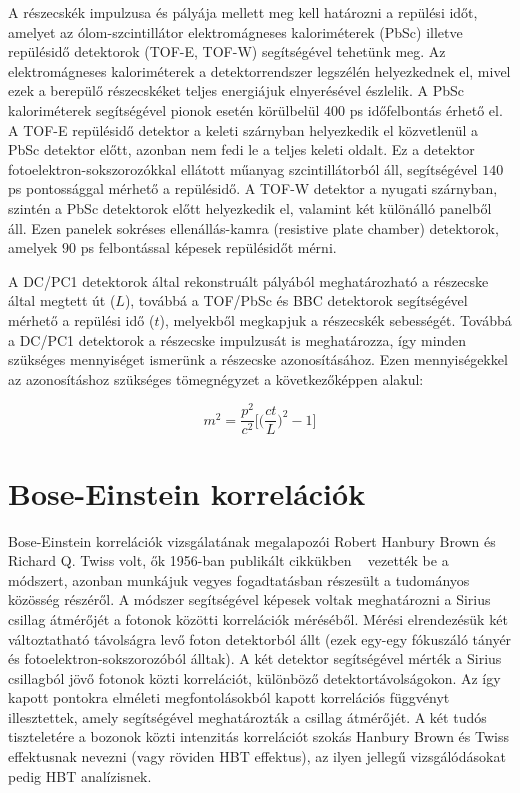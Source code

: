 \documentclass[11pt,a4paper]{article}
\numberwithin{equation}{subsection}
\numberwithin{figure}{section}
\begin{document}
A részecskék impulzusa és pályája mellett meg kell határozni a repülési időt, amelyet az  ólom-szcintillátor elektromágneses kaloriméterek (PbSc) illetve repülésidő detektorok (TOF-E, TOF-W) segítségével tehetünk meg. Az elektromágneses kaloriméterek a detektorrendszer legszélén helyezkednek el, mivel ezek a berepülő részecskéket teljes energiájuk elnyerésével észlelik. A PbSc kaloriméterek segítségével pionok esetén körülbelül $400$ ps időfelbontás érhető el. A TOF-E repülésidő detektor a keleti szárnyban helyezkedik el közvetlenül a PbSc detektor előtt, azonban nem fedi le a teljes keleti oldalt. Ez a detektor fotoelektron-sokszorozókkal ellátott műanyag szcintillátorból áll, segítségével $140$ ps pontossággal mérhető a repülésidő. A TOF-W detektor a nyugati szárnyban, szintén a PbSc detektorok előtt helyezkedik el, valamint két különálló panelből áll. Ezen panelek sokréses ellenállás-kamra (resistive plate chamber) detektorok, amelyek $90$ ps felbontással képesek repülésidőt mérni.


A DC/PC1 detektorok által rekonstruált pályából meghatározható a részecske által megtett út ($L$), továbbá a TOF/PbSc és BBC detektorok segítségével mérhető a repülési idő ($t$), melyekből megkapjuk a részecskék sebességét. Továbbá a DC/PC1 detektorok a részecske impulzusát is meghatározza, így minden szükséges mennyiséget ismerünk a részecske azonosításához. Ezen mennyiségekkel az azonosításhoz szükséges tömegnégyzet a következőképpen alakul:

\begin{equation}
m^2=\frac{p^2}{c^2}\Bigg[\bigg(\frac{ct}{L}\bigg)^2-1\Bigg]
\label{eq:m2}
\end{equation}

\section{Bose-Einstein korrelációk}

Bose-Einstein korrelációk vizsgálatának megalapozói Robert Hanbury Brown és Richard Q. Twiss volt, ők 1956-ban publikált cikkükben ~\cite{HanburyBrown:1956bqd} vezették be a módszert, azonban munkájuk vegyes fogadtatásban részesült a tudományos közösség részéről. A módszer segítségével képesek voltak meghatározni a Sirius csillag átmérőjét a fotonok közötti korrelációk méréséből. Mérési elrendezésük két változtatható távolságra levő foton detektorból állt (ezek egy-egy fókuszáló tányér és fotoelektron-sokszorozóból álltak). A két detektor segítségével mérték a Sirius csillagból jövő fotonok közti korrelációt, különböző detektortávolságokon. Az így kapott pontokra elméleti megfontolásokból kapott korrelációs függvényt illesztettek, amely segítségével meghatározták a csillag átmérőjét. A két tudós tiszteletére a bozonok közti intenzitás korrelációt szokás Hanbury Brown és Twiss effektusnak nevezni (vagy röviden HBT effektus), az ilyen jellegű vizsgálódásokat pedig HBT analízisnek.
\end{document}
